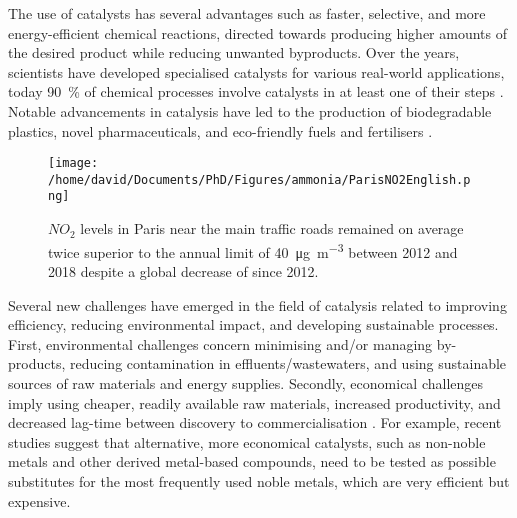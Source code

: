 The use of catalysts has several advantages such as faster, selective, and more energy-efficient chemical reactions, directed towards producing higher amounts of the desired product while reducing unwanted byproducts.
Over the years, scientists have developed specialised catalysts for various real-world applications, today \qty{90}{\percent} of chemical processes involve catalysts in at least one of their steps \parencite{Weiner1998, DeVries2012}.
Notable advancements in catalysis have led to the production of biodegradable plastics, novel pharmaceuticals, and eco-friendly fuels and fertilisers \parencite{Fechete2012}.

\begin{figure}[!htb]
    \centering
    \texttt{[image: /home/david/Documents/PhD/Figures/ammonia/ParisNO2English.png]}
    \caption{
        $NO_2$ levels in Paris near the main traffic roads remained on average twice superior to the annual limit of \qty{40}{\ug \per \m^3} \parencite{AirParis} between 2012 and 2018 despite a global decrease of since 2012.
    }
    \label{fig:NO2Paris}
\end{figure}

Several new challenges have emerged in the field of catalysis related to improving efficiency, reducing environmental impact, and developing sustainable processes.
First, environmental challenges concern minimising and/or managing by-products, reducing contamination in effluents/wastewaters, and using sustainable sources of raw materials \parencite{Ludwig2017, Lange2021} and energy supplies.
Secondly, economical challenges imply using cheaper, readily available raw materials, increased productivity, and decreased lag-time between discovery to commercialisation \parencite{Keisuke2019, Gunay2021}.
For example, recent studies suggest that alternative, more economical catalysts, such as non-noble metals \parencite{Zhong2021, Ruan2022} and other derived metal-based compounds, need to be tested as possible substitutes for the most frequently used noble metals, which are very efficient but expensive.

